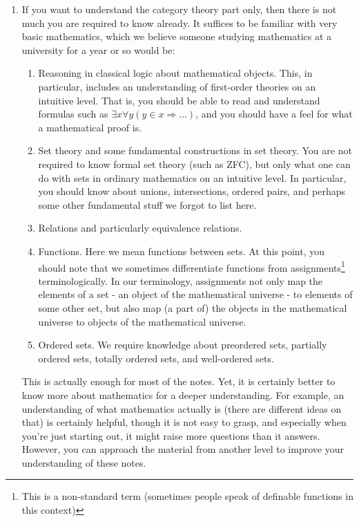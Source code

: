 \begin{enumerate}
\item[(1)]
If you want to understand the category theory part only, then there is not much you are required to know already.
It suffices to be familiar with very basic mathematics, which we believe someone studying mathematics at a university for a year or so would be:
\begin{enumerate}
\item[$\bullet$]
Reasoning in classical logic about mathematical objects.
This, in particular, includes an understanding of first-order theories on an intuitive level.
That is, you should be able to read and understand formulas such as $\exists x \forall y(y \in x \Rightarrow \ldots)$, and you should have a feel for what a mathematical proof is.
\item[$\bullet$]
Set theory and some fundamental constructions in set theory.
You are not required to know formal set theory (such as ZFC), but only what one can do with sets in ordinary mathematics on an intuitive level.
In particular, you should know about unions, intersections, ordered pairs, and perhaps some other fundamental stuff we forgot to list here.
\item[$\bullet$]
Relations and particularly equivalence relations.
\item[$\bullet$]
Functions.
Here we mean functions between sets.
At this point, you should note that we sometimes differentiate functions from {\glqq}assignments{\grqq}\footnote{This is a non-standard term (sometimes people speak of definable functions in this context)} terminologically.
In our terminology, assignments not only map the elements of a set - an object of the mathematical universe - to elements of some other set, but also map (a part of) the objects in the mathematical universe to objects of the mathematical universe.
\item[$\bullet$]
Ordered sets.
We require knowledge about preordered sets, partially ordered sets, totally ordered sets, and well-ordered sets.
\end{enumerate}
This is actually enough for most of the notes.
Yet, it is certainly better to know more about mathematics for a deeper understanding.
For example, an understanding of what mathematics actually is (there are different ideas on that) is certainly helpful, though it is not easy to grasp, and especially when you're just starting out, it might raise more questions than it answers.
However, you can approach the material from another level to improve your understanding of these notes.

\end{enumerate}
